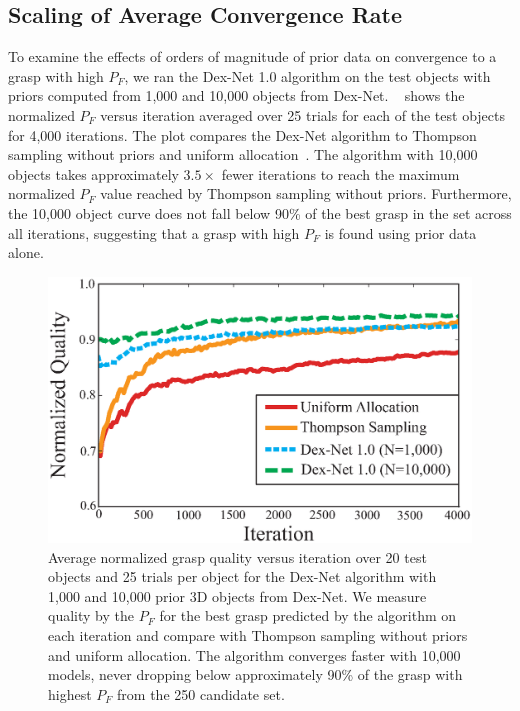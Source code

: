 \subsection{Scaling of Average Convergence Rate}
To examine the effects of orders of magnitude of prior data on convergence to a grasp with high $P_F$, we ran the Dex-Net 1.0 algorithm on the test objects with priors computed from 1,000 and 10,000 objects from Dex-Net. 
~ shows the normalized $P_F$ versus iteration averaged over 25 trials for each of the test objects for 4,000 iterations.
The plot compares the Dex-Net algorithm to Thompson sampling without priors and uniform allocation~\cite{laskey2015bandits}.
The algorithm with 10,000 objects takes approximately $3.5\times$ fewer iterations to reach the maximum normalized $P_F$ value reached by Thompson sampling without priors.
Furthermore, the 10,000 object curve does not fall below 90\% of the best grasp in the set across all iterations, suggesting that a grasp with high $P_F$ is found using prior data alone.

\begin{figure}[t!]
\centering
\includegraphics[scale=0.40]{figures/illustrations/avg_reward.eps}
\caption{Average normalized grasp quality versus iteration over 20 test objects and 25 trials per object for the Dex-Net algorithm with 1,000 and 10,000 prior 3D objects from Dex-Net. We measure quality by the $P_F$ for the best grasp predicted by the algorithm on each iteration and compare with Thompson sampling without priors and uniform allocation. The algorithm converges faster with 10,000 models, never dropping below approximately 90\% of the grasp with highest $P_F$ from the 250 candidate set.}
\vspace*{-10pt}
\end{figure}

